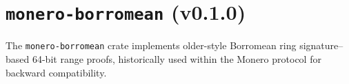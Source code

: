 \documentclass[12pt,a4paper]{article}
\begin{document}




\section{\texttt{monero-borromean} (v0.1.0)}
The \texttt{monero-borromean} crate implements older-style Borromean ring signature--based 64-bit range proofs, historically used within the Monero protocol for backward compatibility. 
\end{document}
